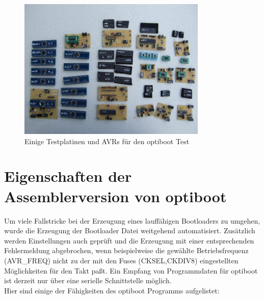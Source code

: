 \begin{figure}[H]
\centering
\includegraphics[width=9cm]{../FIG/Samples_AVR_boot.jpg}
\caption{Einige Testplatinen und AVRs für den optiboot Test}
\label{fig:PlatinesAndAVRs}
\end{figure}


\section{Eigenschaften der Assemblerversion von optiboot}

Um viele Fallstricke bei der Erzeugung eines lauffähigen Bootloaders zu umgehen,
wurde die Erzeugung der Bootloader Datei weitgehend automatisiert.
Zusätzlich werden Einstellungen auch geprüft und die Erzeugung mit
einer entsprechenden Fehlermeldung abgebrochen,
wenn beispielweise die gewählte Betriebsfrequenz (AVR\_FREQ) nicht zu der
mit den Fuses (CKSEL,CKDIV8) eingestellten Möglichkeiten für den Takt paßt.
Ein Empfang von Programmdaten für optiboot ist derzeit nur über eine serielle Schnittstelle möglich.\\

Hier sind einige der Fähigkeiten des optiboot Programms aufgelistet:

